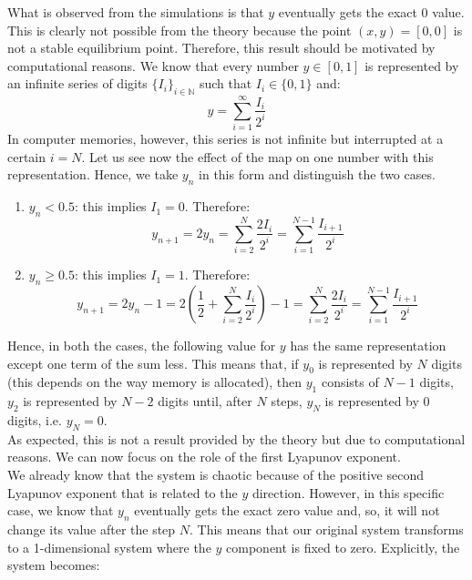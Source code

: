 \documentclass[11pt,titlepage]{article}
\begin{document}
What is observed from the simulations is that $y$ eventually gets the exact 0 value. This is clearly not possible from the theory because the point $(x,y) = [0,0]$ is not a stable equilibrium point. Therefore, this result should be motivated by computational reasons. We know that every number $y \in [0,1]$ is represented by an infinite series of digits $\{I_i\}_{i \in \mathbb{N}}$ such that $I_i \in \{0,1\}$ and:
\begin{equation*}
	y = \sum_{i=1}^\infty \frac{I_i}{2^i}
\end{equation*}
In computer memories, however, this series is not infinite but interrupted at a certain $i=N$. Let us see now the effect of the map on one number with this representation. Hence, we take $y_n$ in this form and distinguish the two cases.
\begin{enumerate}
	\item $y_n < 0.5$: this implies $I_1=0$. Therefore:
	\begin{equation*}
		y_{n+1} = 2y_n = \sum_{i=2}^N \frac{2 I_i}{2^i} = \sum_{i=1}^{N-1} \frac{I_{i+1}}{2^i}
	\end{equation*}
	\item $y_n \ge 0.5$: this implies $I_1=1$. Therefore:
	\begin{equation*}
		y_{n+1} = 2y_n - 1 = 2\left( \frac{1}{2} +\sum_{i=2}^N \frac{I_i}{2^i}\right) - 1 =  \sum_{i=2}^N \frac{2 I_i}{2^i} = \sum_{i=1}^{N-1} \frac{I_{i+1}}{2^i}
	\end{equation*}
\end{enumerate}
Hence, in both the cases, the following value for $y$ has the same representation except one term of the sum less. This means that, if $y_0$ is represented by $N$ digits (this depends on the way memory is allocated), then $y_1$ consists of $N-1$ digits,  $y_2$ is represented by $N-2$ digits until, after $N$ steps, $y_N$ is represented by $0$ digits, i.e. $y_N = 0$. \\
As expected, this is not a result provided by the theory but due to computational reasons. We can now focus on the role of the first Lyapunov exponent. \\
We already know that the system is chaotic because of the positive second Lyapunov exponent that is related to the $y$ direction. However, in this specific case, we know that $y_n$ eventually gets the exact zero value and, so, it will not change its value after the step $N$. This means that our original system transforms to a 1-dimensional system where the $y$ component is fixed to zero. Explicitly, the system becomes:
\end{document}
